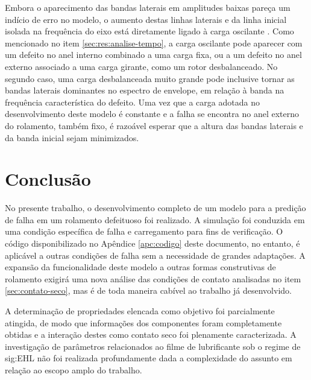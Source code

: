 \documentclass[12pt,oneside,english,brazil,lmodern,siglas,simbolos,cite=num]{ucsmonograph}
\begin{document}
	Embora o aparecimento das bandas laterais em amplitudes baixas pareça um indício de erro no modelo, o aumento destas linhas laterais e da linha inicial isolada na frequência do eixo está diretamente ligado à carga oscilante \cite{cong:2013}.
	Como mencionado no item \ref{sec:res:analise-tempo}, a carga oscilante pode aparecer com um defeito no anel interno combinado a uma carga fixa, ou a um defeito no anel externo associado a uma carga girante, como um rotor desbalanceado.
	No segundo caso, uma carga desbalanceada muito grande pode inclusive tornar as bandas laterais dominantes no espectro de envelope, em relação à banda na frequência característica do defeito.
	Uma vez que a carga adotada no desenvolvimento deste modelo é constante e a falha se encontra no anel externo do rolamento, também fixo, é razoável esperar que a altura das bandas laterais e da banda inicial sejam minimizados.
	
	\begin{figure}[H]
		\label{fig:modelo-ext-envspec-sidebands}
	\end{figure}
	
	\chapter{Conclusão} \label{sec:conclusao}
	No presente trabalho, o desenvolvimento completo de um modelo para a predição de falha em um rolamento defeituoso foi realizado.
	A simulação foi conduzida em uma condição específica de falha e carregamento para fins de verificação.
	O código disponibilizado no Apêndice \ref{apc:codigo} deste documento, no entanto, é aplicável a outras condições de falha sem a necessidade de grandes adaptações.
	A expansão da funcionalidade deste modelo a outras formas construtivas de rolamento exigirá uma nova análise das condições de contato analisadas no item \ref{sec:contato-seco}, mas é de toda maneira cabível ao trabalho já desenvolvido.
	
	A determinação de propriedades elencada como objetivo foi parcialmente atingida, de modo que informações dos componentes foram completamente obtidas e a interação destes como contato seco foi plenamente caracterizada.
	A investigação de parâmetros relacionados ao filme de lubrificante sob o regime de \gls{sig:EHL} não foi realizada profundamente dada a complexidade do assunto em relação ao escopo amplo do trabalho.
	
\end{document}
